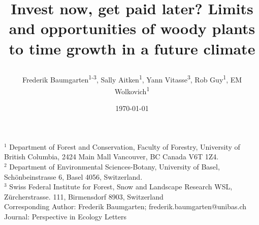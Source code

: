 \documentclass{article}
\begin{document}
	
	
	\title{Invest now, get paid later? Limits and opportunities of woody plants to time growth in a future climate %
		
		
		
		
	
	} 
	
	\date{\today}
	\author{Frederik Baumgarten\textsuperscript{1-3}, Sally Aitken\textsuperscript{1}, Yann Vitasse\textsuperscript{3}, Rob Guy\textsuperscript{1}, EM Wolkovich\textsuperscript{1}}
	\maketitle
	
	$^1$ Department of Forest and Conservation, Faculty of Forestry, University of British Columbia, 2424 Main Mall
	Vancouver, BC Canada V6T 1Z4. \\
	
	$^2$  
	Department of Environmental Sciences-Botany, University of Basel, Schönbeinstrasse 6, Basel 4056, Switzerland. \\
	
	$^3$  
	Swiss Federal Institute for Forest, Snow and Landscape Research WSL, Zürcherstrasse. 111, Birmensdorf 8903, Switzerland
	\\
	
	Corresponding Author: Frederik Baumgarten; frederik.baumgarten@unibas.ch \\
	Journal: Perspective in Ecology Letters
	
	
\end{document}
